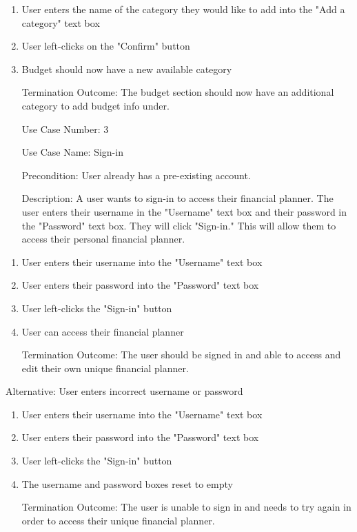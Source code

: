 \documentclass[10pt,conference,onecolumn,compsoc]{IEEEtran}
\begin{document}
\begin{enumerate}
\item User enters the name of the category they would like to add into the "Add a category" text box
\item User left-clicks on the "Confirm" button
\item Budget should now have a new available category
\item[Termination Outcome:] The budget section should now have an additional category to add budget info under.
\end{enumerate}

\begin{itemize}
\item[Use Case Number:] 3
\item[Use Case Name:] Sign-in
\item[Precondition:] User already has a pre-existing account.
\item[Description:] A user wants to sign-in to access their financial planner. The user enters their username in the "Username" text box and their password in the "Password" text box. They will click "Sign-in." This will allow them to access their personal financial planner.
\end{itemize}

\begin{enumerate}
\item User enters their username into the "Username" text box
\item User enters their password into the "Password" text box
\item User left-clicks the "Sign-in" button
\item User can access their financial planner
\item[Termination Outcome:] The user should be signed in and able to access and edit their own unique financial planner.
\end{enumerate}

Alternative: User enters incorrect username or password
\begin{enumerate}
\item User enters their username into the "Username" text box
\item User enters their password into the "Password" text box
\item User left-clicks the "Sign-in" button
\item The username and password boxes reset to empty
\item[Termination Outcome:] The user is unable to sign in and needs to try again in order to access their unique financial planner.
\end {enumerate}
\end{document}
